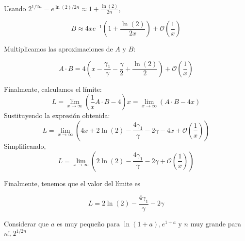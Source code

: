 {Usando $2^{1/2n} =e^{\ln(2)/2n}\approx 1 + \frac{\ln(2)}{2n}$,

\[
B \approx 4 x e^{-1} \left(1 + \frac{\ln(2)}{2x}\right) + \mathcal{O}\left(\frac{1}{x}\right)
\]

Multiplicamos las aproximaciones de $A$ y $B$:

\[
A \cdot B = 4 \left(x - \frac{\gamma_1}{\gamma} - \frac{\gamma}{2} + \frac{\ln(2)}{2}\right) + \mathcal{O}\left(\frac{1}{x}\right)
\]

Finalmente, calculamos el límite:
\[
L=\lim_{x \to \infty} \left(\frac{1}{x} A \cdot B - 4 \right)x = \lim_{x \to \infty} \left(A \cdot B - 4x \right)
\]
Sustituyendo la expresión obtenida:
\[
L=\lim_{x \to \infty} \left(4x + 2 \ln(2) - \frac{4 \gamma_1}{\gamma} - 2 \gamma - 4x + \mathcal{O}\left(\frac{1}{x}\right) \right)
\]
Simplificando,
\[
L=\lim_{x \to \infty} \left( 2 \ln(2) - \frac{4 \gamma_1}{\gamma} - 2 \gamma +\mathcal{O}\left(\frac{1}{x}\right)\right)
\]
}

Finalmente, tenemos que el valor del límite es
\begin{LnxRptaBox}
	\[
	L=  2\ln(2)- \frac{4 \gamma_1}{\gamma} - 2 \gamma
	\]
\end{LnxRptaBox}

\vspace{1.4cm}
{\large   * Considerar que $a$ es muy pequeño para $\ln(1+a), e^{1+a}$ y $n$ muy grande para $ n!, 2^{1/2n}$}
